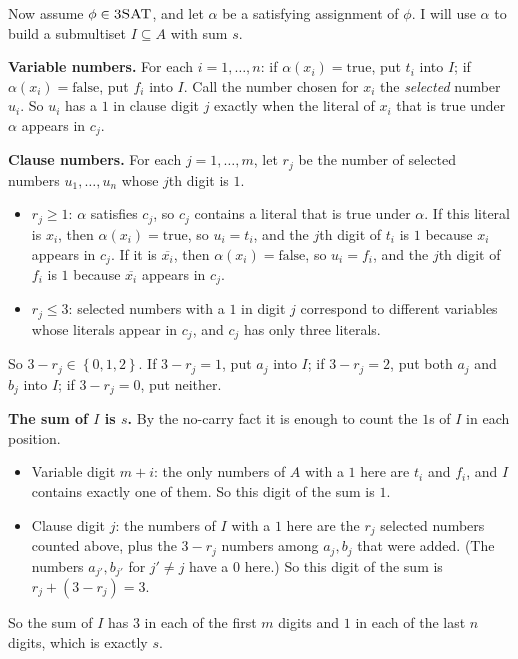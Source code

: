 \documentclass[11pt]{article}
\newcommand{\set}[1]{\left\{#1\right\}}
\newcommand{\cproblem}[1]{\textsc{#1}}
\newcommand{\TSAT}{\cproblem{3SAT}}
\begin{document}
\medskip
Now assume $\phi \in \TSAT$, and let $\alpha$ be a satisfying assignment of $\phi$.
I will use $\alpha$ to build a submultiset $I \subseteq A$ with sum $s$.

\textbf{Variable numbers.}
For each $i = 1, \ldots, n$: if $\alpha(x_i) = \text{true}$, put $t_i$ into $I$; if $\alpha(x_i) = \text{false}$, put $f_i$ into $I$.
Call the number chosen for $x_i$ the \emph{selected} number $u_i$.
So $u_i$ has a $1$ in clause digit $j$ exactly when the literal of $x_i$ that is true under $\alpha$ appears in $c_j$.

\textbf{Clause numbers.}
For each $j = 1, \ldots, m$, let $r_j$ be the number of selected numbers $u_1, \ldots, u_n$ whose $j$th digit is $1$.
\begin{itemize}
  \item $r_j \geq 1$: $\alpha$ satisfies $c_j$, so $c_j$ contains a literal that is true under $\alpha$.
  If this literal is $x_i$, then $\alpha(x_i) = \text{true}$, so $u_i = t_i$, and the $j$th digit of $t_i$ is $1$ because $x_i$ appears in $c_j$.
  If it is $\overline{x_i}$, then $\alpha(x_i) = \text{false}$, so $u_i = f_i$, and the $j$th digit of $f_i$ is $1$ because $\overline{x_i}$ appears in $c_j$.
  \item $r_j \leq 3$: selected numbers with a $1$ in digit $j$ correspond to different variables whose literals appear in $c_j$, and $c_j$ has only three literals.
\end{itemize}
So $3 - r_j \in \set{0, 1, 2}$.
If $3 - r_j = 1$, put $a_j$ into $I$; if $3 - r_j = 2$, put both $a_j$ and $b_j$ into $I$; if $3 - r_j = 0$, put neither.

\textbf{The sum of $I$ is $s$.}
By the no-carry fact it is enough to count the $1$s of $I$ in each position.
\begin{itemize}
  \item Variable digit $m + i$: the only numbers of $A$ with a $1$ here are $t_i$ and $f_i$, and $I$ contains exactly one of them.
  So this digit of the sum is $1$.
  \item Clause digit $j$: the numbers of $I$ with a $1$ here are the $r_j$ selected numbers counted above, plus the $3 - r_j$ numbers among $a_j, b_j$ that were added.
  (The numbers $a_{j'}, b_{j'}$ for $j' \neq j$ have a $0$ here.)
  So this digit of the sum is $r_j + (3 - r_j) = 3$.
\end{itemize}
So the sum of $I$ has $3$ in each of the first $m$ digits and $1$ in each of the last $n$ digits, which is exactly $s$.
\end{document}
